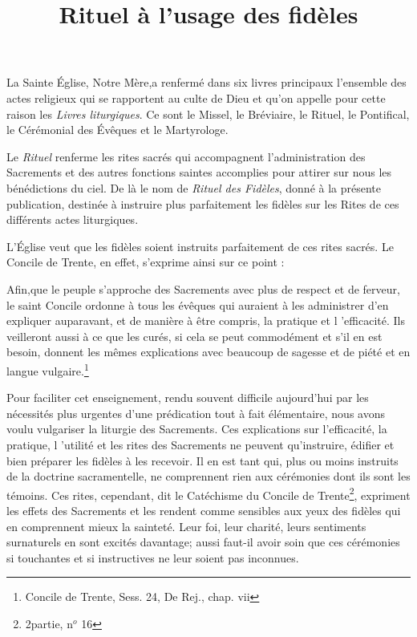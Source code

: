 \documentclass[%
fontsize=10%
,a5paper%
,DIV=15%
]{scrartcl}
\title{Rituel à l'usage des fidèles}
\author{}
\date{}
\begin{document}
\maketitle
\newpage
{}
La Sainte Église, Notre Mère,a renfermé dans six livres principaux
l'ensemble des actes religieux qui se rapportent au
culte de Dieu et qu'on appelle pour cette raison les \emph{Livres
liturgiques}. Ce sont le Missel, le Bréviaire, le Rituel, le Pontifical,
le Cérémonial des Évêques et le Martyrologe.

Le \emph{Rituel} renferme les rites sacrés qui accompagnent l'administration
des Sacrements et des autres fonctions saintes accomplies
pour attirer sur nous les bénédictions du ciel. De là
le nom de \emph{Rituel des Fidèles}, donné à la présente publication,
destinée à instruire plus parfaitement les fidèles sur les Rites
de ces différents actes liturgiques.

L'Église veut que les fidèles soient instruits parfaitement
de ces rites sacrés. Le Concile de Trente, en effet, s'exprime
ainsi sur ce point  :

\og Afin,que le peuple s'approche des Sacrements avec plus
de respect et de ferveur, le saint Concile ordonne à tous les
évêques qui auraient à les administrer d'en expliquer auparavant,
et de manière à être compris, la pratique et l 'efficacité.
Ils veilleront aussi à ce que les curés, si cela se peut commodément
et s'il en est besoin, donnent les mêmes explications avec
beaucoup de sagesse et de piété et en langue vulgaire.\fg \footnote{Concile de Trente, Sess. 24, De Rej., chap. vii}

Pour faciliter cet enseignement, rendu souvent difficile
aujourd'hui par les nécessités plus urgentes d'une prédication
tout à fait élémentaire, nous avons voulu vulgariser la liturgie
des Sacrements. Ces explications sur l'efficacité, la pratique,
l 'utilité et les rites des Sacrements ne peuvent qu'instruire,
édifier et bien préparer les fidèles à les recevoir. Il en est tant
qui, plus ou moins instruits de la doctrine sacramentelle, ne
comprennent rien aux cérémonies dont ils sont les témoins.
\og Ces rites, cependant, dit le Catéchisme du Concile de Trente\footnote{2\ieme partie, n$^o$ 16}, expriment les effets des Sacrements et les
rendent comme sensibles aux yeux des fidèles qui en comprennent mieux la sainteté. Leur foi, leur charité, leurs sentiments
surnaturels en sont excités davantage; aussi faut-il
avoir soin que ces cérémonies si touchantes et si instructives
ne leur soient pas inconnues.\fg
\end{document}
